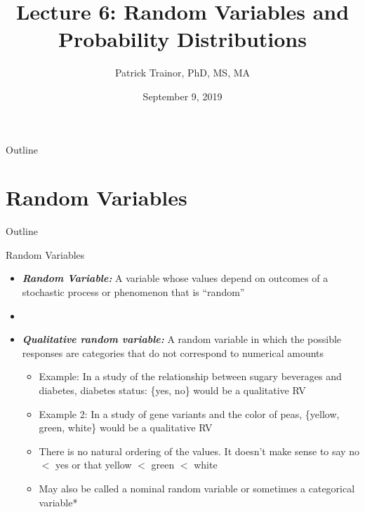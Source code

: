 \documentclass[xcolor=dvipsnames]{beamer}
\title[Lecture 6]{Lecture 6: Random Variables and Probability Distributions}
\author[Patrick Trainor]{Patrick Trainor, PhD, MS, MA}
\institute[NMSU]{New Mexico State University}
\date{September 9, 2019}
\begin{document}
\begin{frame}
	\maketitle
\end{frame}

\begin{frame}{Outline}
	\tableofcontents[hideallsubsections]
\end{frame}

\section{Random Variables}
\begin{frame}{Outline}
	\tableofcontents[currentsection,subsectionstyle=show/shaded/hide]
\end{frame}

\begin{frame}{Random Variables}
	\begin{itemize}
		\item \textbf{\emph{Random Variable:}} A variable whose values depend on outcomes of a stochastic process or phenomenon that is ``random''
		\item[]
		\item \textbf{\emph{Qualitative random variable:}} A random variable in which the possible responses are categories that do not correspond to numerical amounts
		\begin{itemize}
			\item Example: In a study of the relationship between sugary beverages and diabetes, diabetes status: \{yes, no\} would be a qualitative RV
			\item Example 2: In a study of gene variants and the color of peas, \{yellow, green, white\} would be a qualitative RV
			\item There is no natural ordering of the values. It doesn't make sense to say no $<$ yes or that yellow $<$ green $<$ white
			\item May also be called a nominal random variable or sometimes a categorical variable*
		\end{itemize}
	\end{itemize}
\end{frame}
\end{document}
